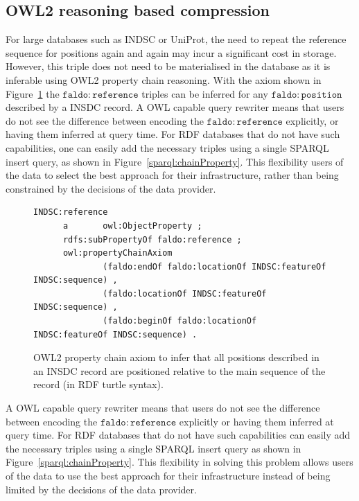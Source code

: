 \subsection*{OWL2 reasoning based compression}
For large databases such as INDSC or UniProt,
the need to repeat the reference sequence for positions again and again may incur a significant cost in storage.
However, this triple does not need to be materialised in the database as it is inferable using OWL2 property chain reasoning.
With the axiom shown in Figure~\ref{owl:chainProperty} the $\mathtt{faldo\colon{}reference}$ triples can be inferred for any $\mathtt{faldo\colon{}position}$ described by a INSDC record.
A OWL capable query rewriter means that users do not see the difference between encoding the $\mathtt{faldo\colon{}reference}$ explicitly, or having them inferred at query time.
For RDF databases that do not have such capabilities,
one can easily add the necessary triples using a single SPARQL insert query,
as shown in Figure~\ref{sparql:chainProperty}.
This flexibility users of the data to select the best approach for their infrastructure, rather than being constrained by the decisions of the data provider.

\begin{figure}
\begin{shaded}
\small
\begin{verbatim}
INDSC:reference
      a       owl:ObjectProperty ;
      rdfs:subPropertyOf faldo:reference ;
      owl:propertyChainAxiom
              (faldo:endOf faldo:locationOf INDSC:featureOf INDSC:sequence) , 
              (faldo:locationOf INDSC:featureOf INDSC:sequence) , 
              (faldo:beginOf faldo:locationOf INDSC:featureOf INDSC:sequence) .

\end{verbatim}
\end{shaded}
\caption{OWL2 property chain axiom to infer that all positions described in an INSDC record are positioned relative to the main sequence of the record (in RDF turtle syntax).}
\label{owl:chainProperty}
\end{figure}

A OWL capable query rewriter means that users do not see the difference between encoding the $\mathtt{faldo\colon{}reference}$ explicitly or having them inferred at query time.
For RDF databases that do not have such capabilities can easily add the necessary triples using a single SPARQL insert query as shown in Figure~\ref{sparql:chainProperty}.
This flexibility in solving this problem allows users of the data to use the best approach for their infrastructure instead of being limited by the decisions of the data provider.

